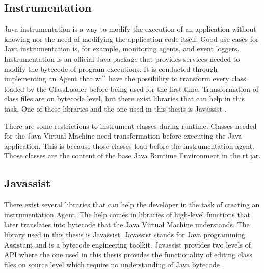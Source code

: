 \subsection{Instrumentation}
Java instrumentation is a way to modify the execution of an application without knowing nor the need of modifying the application code itself. Good use cases for Java instrumentation is, for example, monitoring agents, and event loggers. Instrumentation is an official Java package that provides services needed to modify the bytecode of program executions. It is conducted through implementing an Agent that will have the possibility to transform every class loaded by the ClassLoader before being used for the first time. Transformation of class files are on bytecode level, but there exist libraries that can help in this task. One of these libraries and the one used in this thesis is Javassist \parencite{Java_Instrument, Javassist}.

There are some restrictions to instrument classes during runtime. Classes needed for the Java Virtual Machine need transformation before executing the Java application. This is because those classes load before the instrumentation agent. Those classes are the content of the base Java Runtime Environment in the rt.jar.



\subsection{Javassist}
There exist several libraries that can help the developer in the task of creating an instrumentation Agent. The help comes in libraries of high-level functions that later translates into bytecode that the Java Virtual Machine understands. The library used in this thesis is Javassist. Javassist stands for Java programming Assistant and is a bytecode engineering toolkit. Javassist provides two levels of API where the one used in this thesis provides the functionality of editing class files on source level which require no understanding of Java bytecode \parencite{Javassist}.